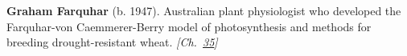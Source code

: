 \textbf{Graham Farquhar} (b. 1947). Australian plant physiologist who developed the Farquhar-von Caemmerer-Berry model of photosynthesis and methods for breeding drought-resistant wheat. \emph{[Ch.~\hyperref[ch:treesfromair]{35}]}

